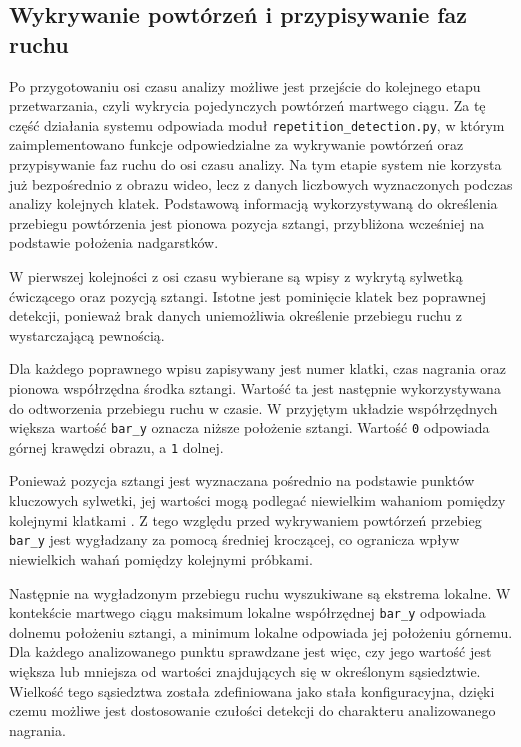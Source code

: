 \subsection{Wykrywanie powtórzeń i przypisywanie faz ruchu}

Po przygotowaniu osi czasu analizy możliwe jest przejście do kolejnego etapu przetwarzania, czyli wykrycia pojedynczych powtórzeń martwego ciągu. Za tę część działania systemu odpowiada moduł \texttt{repetition\_detection.py}, w którym zaimplementowano funkcje odpowiedzialne za wykrywanie powtórzeń oraz przypisywanie faz ruchu do osi czasu analizy. Na tym etapie system nie korzysta już bezpośrednio z obrazu wideo, lecz z danych liczbowych wyznaczonych podczas analizy kolejnych klatek. Podstawową informacją wykorzystywaną do określenia przebiegu powtórzenia jest pionowa pozycja sztangi, przybliżona wcześniej na podstawie położenia nadgarstków.

W pierwszej kolejności z osi czasu wybierane są wpisy z wykrytą sylwetką ćwiczącego oraz pozycją sztangi. Istotne jest pominięcie klatek bez poprawnej detekcji, ponieważ brak danych uniemożliwia określenie przebiegu ruchu z wystarczającą pewnością.

Dla każdego poprawnego wpisu zapisywany jest numer klatki, czas nagrania oraz pionowa współrzędna środka sztangi. Wartość ta jest następnie wykorzystywana do odtworzenia przebiegu ruchu w czasie. W przyjętym układzie współrzędnych większa wartość \texttt{bar\_y} oznacza niższe położenie sztangi. Wartość \texttt{0} odpowiada górnej krawędzi obrazu, a \texttt{1} dolnej.

Ponieważ pozycja sztangi jest wyznaczana pośrednio na podstawie punktów kluczowych sylwetki, jej wartości mogą podlegać niewielkim wahaniom pomiędzy kolejnymi klatkami \cite{wade2022markerless,mundt2024twodimensional}. Z tego względu przed wykrywaniem powtórzeń przebieg \texttt{bar\_y} jest wygładzany za pomocą średniej kroczącej, co ogranicza wpływ niewielkich wahań pomiędzy kolejnymi próbkami.

Następnie na wygładzonym przebiegu ruchu wyszukiwane są ekstrema lokalne. W kontekście martwego ciągu maksimum lokalne współrzędnej \texttt{bar\_y} odpowiada dolnemu położeniu sztangi, a minimum lokalne odpowiada jej położeniu górnemu. Dla każdego analizowanego punktu sprawdzane jest więc, czy jego wartość jest większa lub mniejsza od wartości znajdujących się w określonym sąsiedztwie. Wielkość tego sąsiedztwa została zdefiniowana jako stała konfiguracyjna, dzięki czemu możliwe jest dostosowanie czułości detekcji do charakteru analizowanego nagrania.

